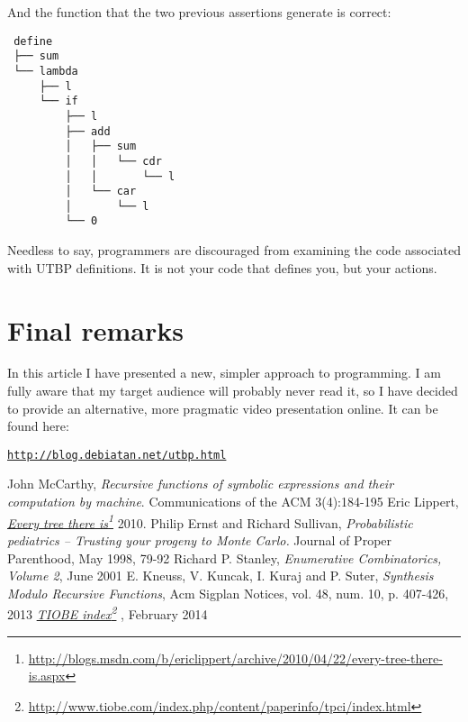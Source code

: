 \documentclass[12pt,twocolumn]{article}
\newcommand\fnurl[2]{%
  \href{#1}{#2}\footnote{\url{#1}}%
}
\begin{document}
And the function that the two previous assertions generate is correct:

\begin{verbatim}
 define
 ├── sum
 └── lambda
     ├── l
     └── if
         ├── l
         ├── add
         │   ├── sum
         │   │   └── cdr
         │   │       └── l
         │   └── car
         │       └── l
         └── 0
\end{verbatim}

Needless to say, programmers are discouraged from examining the code associated with UTBP definitions. It is not your code that defines you, but your actions.

\section{Final remarks}

In this article I have presented a new, simpler approach to programming. I am fully aware that my target audience will probably never read it, so I have decided to provide an alternative, more pragmatic video presentation online. It can be found here:

\href{http://blog.debiatan.net/utbp.html}{\texttt{http://blog.debiatan.net/utbp.html}}

\begin{thebibliography}{1}
     John McCarthy, {\it Recursive functions of symbolic expressions and their computation by machine}. Communications of the ACM 3(4):184-195
     Eric Lippert,
    {\it \fnurl{http://blogs.msdn.com/b/ericlippert/archive/2010/04/22/every-tree-there-is.aspx}{Every tree there is}} 2010.
     Philip Ernst and Richard Sullivan, {\it Probabilistic pediatrics -- Trusting your progeny to Monte Carlo.} Journal of Proper Parenthood, May 1998, 79-92
     Richard P. Stanley, {\it Enumerative Combinatorics, Volume 2}, June 2001
     E. Kneuss, V. Kuncak, I. Kuraj and P. Suter, {\it Synthesis Modulo Recursive Functions}, Acm Sigplan Notices, vol. 48, num. 10, p. 407-426, 2013
     {\it \fnurl{http://www.tiobe.com/index.php/content/paperinfo/tpci/index.html}{TIOBE index}}, February 2014
        
\end{thebibliography}
\end{document}
